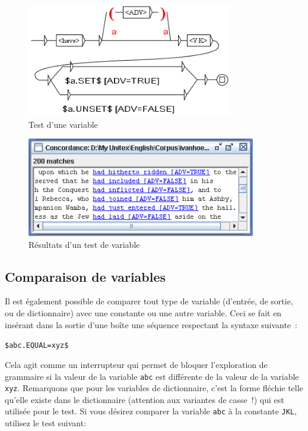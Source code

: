 \begin{figure}[!ht]
\begin{center}
\includegraphics[width=9cm]{resources/img/fig6-29b.png}
\caption{Test d'une variable\label{fig-testing-a-variable}}
\end{center}
\end{figure}

\begin{figure}[!ht]
\begin{center}
\includegraphics[width=10cm]{resources/img/fig6-29c.png}
\caption{Résultats d'un test de variable\label{fig-testing-a-variable-results}}
\end{center}
\end{figure}


\subsection{Comparaison de variables}
Il est également possible de comparer tout type de variable (d'entrée, de sortie, ou de dictionnaire) avec une constante ou une autre variable. Ceci se fait en insérant dans la sortie d'une boîte une séquence respectant la syntaxe suivante~:


\bigskip
\noindent \verb+$abc.EQUAL=xyz$+

\bigskip
\noindent Cela agit comme un interrupteur qui permet de bloquer l'exploration de grammaire si la valeur de la variable \verb+abc+ est différente de la valeur de la variable \verb+xyz+. Remarquons que pour les variables de dictionnaire, c'est la forme fléchie telle qu'elle existe dans le dictionnaire (attention aux variantes de casse~!) qui est utilisée pour le test. Si vous désirez comparer la variable \verb+abc+ à la constante \verb+JKL+, utilisez le test suivant:

